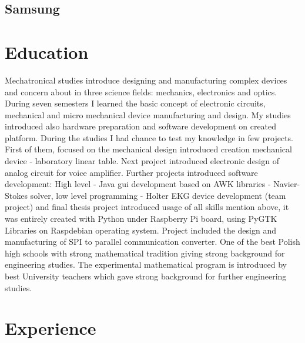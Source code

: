 \documentclass[8pt,a4paper]{moderncv}
\begin{document}
\subsection{Samsung}

\section{Education}
\vspace{4mm}
\cvline{}{}
Mechatronical studies introduce designing and manufacturing complex devices and concern about in three science fields: mechanics, electronics and optics.
During seven semesters I learned the basic concept of electronic circuits, mechanical and micro mechanical device manufacturing and design.
My studies introduced also hardware preparation and software development on created platform.
During the studies I had chance to test my knowledge in few projects. First of them, focused on the
mechanical design introduced creation mechanical device - laboratory linear table. Next project introduced electronic design of analog circuit for voice amplifier.
Further projects introduced software development: High level - Java gui development based on AWK libraries - Navier-Stokes solver, low level programming - Holter EKG device development (team project) and 
final thesis project introduced usage of all skills mention above, it was entirely created with Python under Raspberry Pi board, using PyGTK Libraries on Raspdebian operating system.
Project included the design and manufacturing of SPI to parallel communication converter.
\cvline{}{}
\cvline{}{}
\vspace{4mm}
\cvline{}{}
One of the best Polish high schools with strong mathematical tradition giving strong background for engineering studies.
The experimental mathematical program is introduced by best University teachers which gave strong background for further engineering studies.
\cvline{}{}

\section{Experience}
\end{document}
